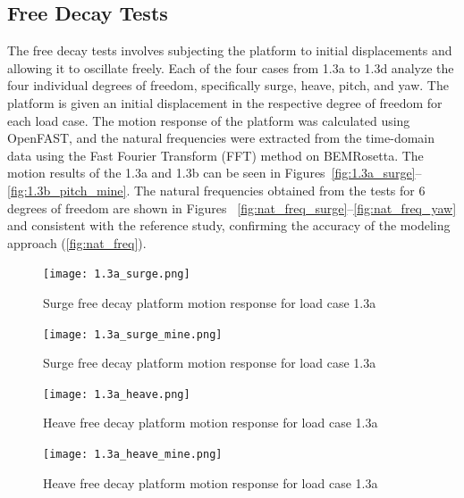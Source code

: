 \documentclass[a4paper, 11pt]{article}
\begin{document}
\subsection{Free Decay Tests}
\hspace*{0.5cm}The free decay tests involves subjecting the platform to initial displacements and allowing it to oscillate freely. Each of the four cases from 1.3a to 1.3d analyze the four individual degrees of freedom, specifically surge, heave, pitch, and yaw. The platform is given an initial displacement in the respective degree of freedom for each load case. The motion response of the platform was calculated using OpenFAST, and the natural frequencies were extracted from the time-domain data using the Fast Fourier Transform (FFT) method on BEMRosetta. The motion results of the 1.3a and 1.3b can be seen in Figures~\ref{fig:1.3a_surge}--\ref{fig:1.3b_pitch_mine}. The natural frequencies obtained from the tests for 6 degrees of freedom are shown in Figures ~\ref{fig:nat_freq_surge}--\ref{fig:nat_freq_yaw} and consistent with the reference study, confirming the accuracy of the modeling approach (\autoref{fig:nat_freq}).
\vspace{0.3cm}

\begin{figure}[H]
    \begin{minipage}{0.48\textwidth}
        \centering
        \texttt{[image: 1.3a\_surge.png]}
        \caption{\small Surge free decay platform motion response for load case 1.3a \cite{Robertson2014}}
        \label{fig:1.3a_surge}
    \end{minipage}
    \hfill
    \begin{minipage}{0.49\textwidth}
        \centering
        \texttt{[image: 1.3a\_surge\_mine.png]}
        \caption{\small Surge free decay platform motion response for load case 1.3a}
        \label{fig:1.3a_surge_mine}
    \end{minipage}
\end{figure}

\begin{figure}[H]
    \begin{minipage}{0.48\textwidth}
        \centering
        \texttt{[image: 1.3a\_heave.png]}
        \caption{\small Heave free decay platform motion response for load case 1.3a \cite{Robertson2014}}
        \label{fig:1.3a_heave}
    \end{minipage}
    \hfill
    \begin{minipage}{0.49\textwidth}
        \centering
        \texttt{[image: 1.3a\_heave\_mine.png]}
        \caption{\small Heave free decay platform motion response for load case 1.3a}
        \label{fig:1.3a_heave_mine}
    \end{minipage}
\end{figure}
\end{document}
